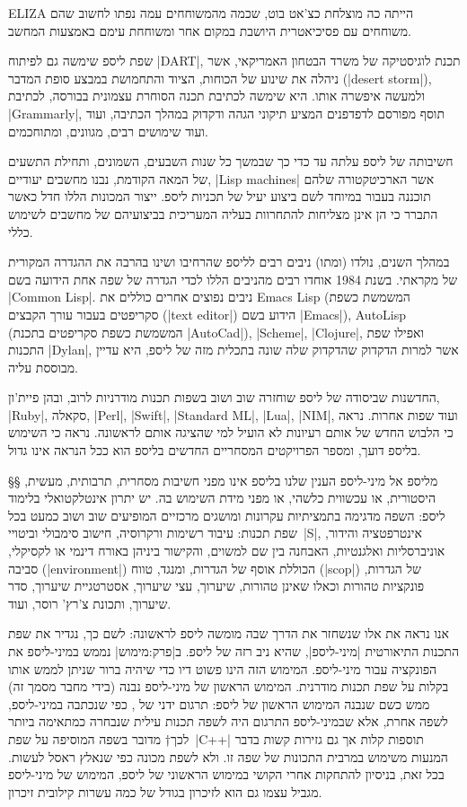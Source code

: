 ELIZA הייתה כה מוצלחת כצ'אט בוט, שכמה מהמשוחחים עמה נפתו לחשוב שהם משוחחים עם
פסיכיאטרית היושבת במקום אחר ומשוחחת עימם באמצעות המחשב.

שפת ליספ שימשה גם לפיתוח \E|DART|, תכנת לוגיסטיקה של משרד הבטחון האמריקאי, אשר
ניהלה את שינוע של הכוחות, הציוד והתחמושת במבצע סופת המדבר (\E|desert storm|),
ולמעשה איפשרה אותו. היא שימשה לכתיבת תכנה הסוחרת עצמונית בבורסה, לכתיבת
\E|Grammarly|, תוסף מפורסם לדפדפנים המציע תיקוני הגהה ודקדוק במהלך הכתיבה, ועוד
ועוד שימושים רבים, מגוונים, ומתוחכמים.

חשיבותה של ליספ עלתה עד כדי כך שבמשך כל שנות השבעים, השמונים, ותחילת התשעים של
המאה הקודמת, נבנו מחשבים יעודיים, \E|Lisp machines| אשר הארכיטקטורה שלהם תוכננה
בעבור במיוחד לשם ביצוע יעיל של תכניות ליספ. ייצור המכונות הללו חדל כאשר התברר
כי הן אינן מצליחות להתחרוות בעליה המעריכית בביצועיהם של מחשבים לשימוש כללי.

במהלך השנים, נולדו (ומתו) ניבים רבים לליספ שהרחיבו ושינו בהרבה את ההגדרה
המקורית של מקראתי. בשנת 1984 אוחדו רבים מהניבים הללו לכדי הגדרה של שפה אחת
הידועה בשם \E|Common Lisp|. ניבים נפוצים אחרים כוללים את Emacs Lisp (המשמשת
כשפת סקריפטים בעבור עורך הקבצים (\E|text editor|) הידוע בשם \E|Emacs|),
AutoLisp (המשמשת כשפת סקריפטים בתכנת \E|AutoCad|), \E|Scheme|, \E|Clojure|,
ואפילו שפת התכנות \E|Dylan|, אשר למרות הדקדוק שהדקדוק שלה שונה בתכלית מזה של
ליספ, היא עדיין מבוססת עליה.

החדשנות שביסודה של ליספ שוחזרה שוב ושוב בשפות תכנות מודרניות לרוב, ובהן
פיית'ון, \E|Ruby|, סקאלה, \E|Perl|, \E|Swift|, \E|Standard ML|, \E|Lua|,
\E|NIM|, ועוד שפות אחרות. נראה כי הלבוש החדש של אותם רעיונות לא הועיל למי
שהציגה אותם לראשונה. נראה כי השימוש בליספ דועך, ומספר הפרויקטים המסחריים החדשים
בליספ הוא ככל הנראה אינו גדול.

§§ מליספ אל מיני-ליספ
הענין שלנו בליספ אינו מפני חשיבות מסחרית, תרבותית, מעשית, היסטורית, או עכשווית
כלשהי, או מפני מידת השימוש בה. יש יתרון אינטלקטואלי בלימוד ליספ:
השפה מדגימה בתמציתיות עקרונות ומושגים מרכזיים המופיעים שוב ושוב כמעט בכל שפת
תכנות: עיבוד רשימות ורקרוסיה, חישוב סימבולי וביטויי~\E|S|, אינטרפטציה והידור,
אוניברסליות ואלגנטיות, האבחנה בין שם למשוים, והקישור ביניהן באורח דינמי או
לקסיקלי, סביבה (\E|environment|) הכוללת אוסף של הגדרות, ומנגד, טווח (\E|scop|)
של הגדרות, פונקציות טהורות וכאלו שאינן טהורות, שיערוך, עצי שיערוך, אסטרטגיית
שיערוך, סדר שיערוך, ותכונת צ'רץ' רוסר, ועוד.

אנו נראה את אלו שנשחזר את הדרך שבה מומשה ליספ לראשונה: לשם כך, נגדיר את שפת
התכנות התיאורטית \ע|מיני-ליספ|, שהיא ניב רזה של ליספ. ב|פרק:מימוש| נממש
במיני-ליספ את הפונקציה  עבור מיני-ליספ. המימוש הזה הינו פשוט דיו
כדי שיהיה ברור שניתן לממש אותו בקלות על שפת תכנות מודרנית. המימוש הראשון של
מיני-ליספ נבנה (בידי מחבר מסמך זה) ממש כשם שנבנה המימוש הראשון של ליספ:
תרגום ידני של , כפי שנכתבה במיני-ליספ, לשפה אחרת, אלא
שבמיני-ליספ התרגום היה לשפה תכנות עילית שנבחרה כמתאימה ביותר לכך†{%
מדובר בשפה המוסיפה על שפת~\E|C++| תוספות קלות אך גם גזירות קשות בדבר
המנעות משימוש במרבית התכונות של שפה זו.
}
ולא לשפת מכונה כפי שנאלץ ראסל לעשות. בכל זאת, בניסיון להתחקות אחרי הקושי
במימוש הראשוני של ליספ, המימוש של מיני-ליספ מגביל עצמו גם הוא לזיכרון בגודל של
כמה עשרות קילובית זיכרון.

